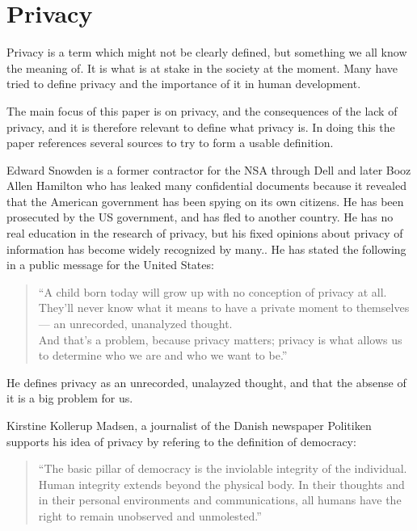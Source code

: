 \section{Privacy}
Privacy is a term which might not be clearly defined, but something we all know the meaning of. It is what is at stake in the society at the moment. Many have tried to define privacy and the importance of it in human development.

The main focus of this paper is on privacy, and the consequences of the lack of privacy, and it is therefore relevant to define what privacy is. In doing this the paper references several sources to try to form a usable definition.

Edward Snowden is a former contractor for the NSA through Dell and later Booz Allen Hamilton who has leaked many confidential documents because it revealed that the American government has been spying on its own citizens. He has been prosecuted by the US government, and has fled to another country. He has no real education in the research of privacy, but his fixed opinions about privacy of information has become widely recognized by many.\cite{website:edward-snowden-basic}. He has stated the following in a public message for the United States:

\blockquote{``A child born today will grow up with no conception of privacy at all. They’ll never know what it means to have a private moment to themselves — an unrecorded, unanalyzed thought.\\ And that’s a problem, because privacy matters; privacy is what allows us to determine who we are and who we want to be.''\cite{interview:edward-snowden-christmas}}
He defines privacy as an unrecorded, unalayzed thought, and that the absense of it is a big problem for us.

Kirstine Kollerup Madsen, a journalist of the Danish newspaper Politiken supports his idea of privacy by refering to the definition of democracy:

\blockquote{``The basic pillar of democracy is the inviolable integrity of the individual. Human integrity extends beyond the physical body. In their thoughts and in their personal environments and communications, all humans have the right to remain unobserved and unmolested.''\cite{website:a-stand-for-democracy}}

